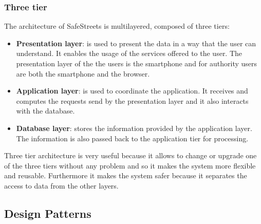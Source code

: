             \subsubsection{Three tier}
            The architecture of SafeStreets is multilayered, composed of three tiers:
            \begin{itemize}
                \item \textbf{Presentation layer}: is used to present the data in a way
                that the user can understand. It enables the usage of the services
                offered to the user. The presentation layer of the the users is the
                smartphone and for authority users are both the smartphone and the
                browser.
                \item \textbf{Application layer}: is used to coordinate the application.
                It receives and computes the requests send by the presentation layer and
                it also interacts with the database.
                \item \textbf{Database layer}: stores the information provided by the
                application layer. The information is also passed back to the
                application tier for processing.
            \end{itemize}    
            Three tier architecture is very useful because it allows to change or
            upgrade one of the three tiers without any problem and so it makes the
            system more flexible and reusable. Furthermore it makes the system safer
            because it separates the access to data from the other layers.
                
  
        \subsection{Design Patterns}
